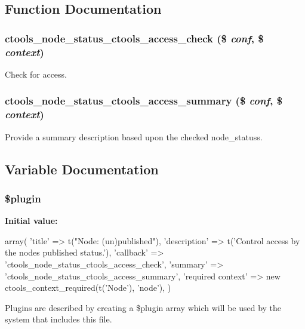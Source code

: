 \subsection{Function Documentation}
\hypertarget{node__status_8inc_a2493a0d6a284ebfd109d5eba54b3d298}{
\subsubsection[{ctools\_\-node\_\-status\_\-ctools\_\-access\_\-check}]{\setlength{\rightskip}{0pt plus 5cm}ctools\_\-node\_\-status\_\-ctools\_\-access\_\-check (\$ {\em conf}, \/  \$ {\em context})}}
\label{node__status_8inc_a2493a0d6a284ebfd109d5eba54b3d298}
Check for access. \hypertarget{node__status_8inc_a99af9ccef78c55c4c2eeac817fa38252}{
\subsubsection[{ctools\_\-node\_\-status\_\-ctools\_\-access\_\-summary}]{\setlength{\rightskip}{0pt plus 5cm}ctools\_\-node\_\-status\_\-ctools\_\-access\_\-summary (\$ {\em conf}, \/  \$ {\em context})}}
\label{node__status_8inc_a99af9ccef78c55c4c2eeac817fa38252}
Provide a summary description based upon the checked node\_\-statuss. 

\subsection{Variable Documentation}
\hypertarget{node__status_8inc_ada8a7130088351710bb02ed622d6bf65}{
\subsubsection[{\$plugin}]{\setlength{\rightskip}{0pt plus 5cm}\$plugin}}
\label{node__status_8inc_ada8a7130088351710bb02ed622d6bf65}
{\bfseries Initial value:}
\begin{DoxyCode}
 array(
  'title' => t("Node: (un)published"),
  'description' => t('Control access by the nodes published status.'),
  'callback' => 'ctools_node_status_ctools_access_check',
  'summary' => 'ctools_node_status_ctools_access_summary',
  'required context' => new ctools_context_required(t('Node'), 'node'),
)
\end{DoxyCode}
Plugins are described by creating a \$plugin array which will be used by the system that includes this file. 